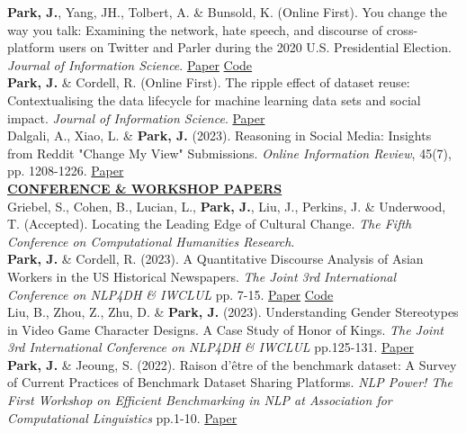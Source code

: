 \documentclass{article}
\begin{document}
\noindent \textbf{Park, J.}, Yang, JH., Tolbert, A. \& Bunsold, K. (Online First). You change the way you talk: Examining the network, hate speech, and discourse of cross-platform users on Twitter and Parler during the 2020 U.S. Presidential Election. \textit{Journal of Information Science}. \hfill \href{https://journals.sagepub.com/doi/abs/10.1177/01655515241238405}{Paper} \href{https://github.com/park-jay/cross-platform}{Code} \\ 

\noindent \textbf{Park, J.} \& Cordell, R. (Online First). The ripple effect of dataset reuse: Contextualising the data lifecycle for machine learning data sets and social impact. \textit{Journal of Information Science}. \hfill \href{https://journals.sagepub.com/doi/abs/10.1177/01655515231212977}{Paper} \\

\noindent Dalgali, A., Xiao, L. \& \textbf{Park, J.} (2023). Reasoning in Social Media: Insights from Reddit "Change My View" Submissions. \textit{Online Information Review}, 45(7), pp. 1208-1226. \hfill \href{https://www.emerald.com/insight/content/doi/10.1108/OIR-08-2020-0330/full/html}{Paper} \\

\noindent \textbf{\underline{CONFERENCE \& WORKSHOP PAPERS}} \\ 
Griebel, S., Cohen, B., Lucian, L., \textbf{Park, J.}, Liu, J., Perkins, J. \& Underwood, T. (Accepted). Locating the Leading Edge of Cultural Change. \textit{The Fifth Conference on Computational Humanities Research}. \\

\noindent \textbf{Park, J.} \& Cordell, R. (2023). A Quantitative Discourse Analysis of Asian Workers in the US Historical Newspapers. \textit{The Joint 3rd International Conference on NLP4DH \& IWCLUL} pp. 7-15. \hfill \href{https://aclanthology.org/2023.nlp4dh-1.2/}{Paper} \href{https://github.com/park-jay/coolie}{Code}\\

\noindent Liu, B., Zhou, Z., Zhu, D. \& \textbf{Park, J.} (2023). Understanding Gender Stereotypes in Video Game Character Designs. A Case Study of Honor of Kings. \textit{The Joint 3rd International Conference on NLP4DH \& IWCLUL} pp.125-131. \hfill \href{https://arxiv.org/pdf/2311.14226}{Paper} \\

\noindent \textbf{Park, J.} \& Jeoung, S. (2022). Raison d'être of the benchmark dataset: A Survey of Current Practices of Benchmark Dataset Sharing Platforms. \textit{NLP Power! The First Workshop on Efficient Benchmarking in NLP at Association for Computational Linguistics} pp.1-10. \hfill \href{https://aclanthology.org/2022.nlppower-1.1/}{Paper} \\
\end{document}
